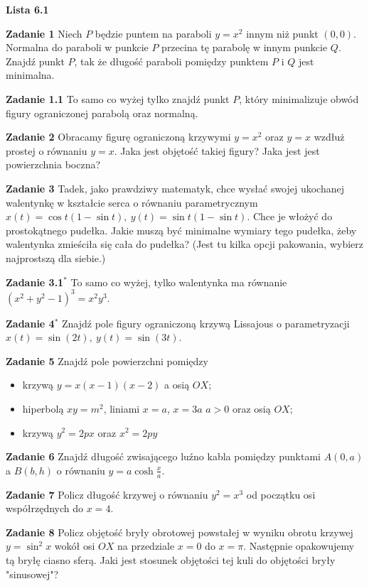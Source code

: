 \documentclass[a4paper,11pt]{article}
\begin{document}
\begin{center}
  {\large\textbf{Lista 6.1}}
\end{center}

\textbf{Zadanie 1}  Niech $P$ będzie puntem na paraboli $y=x^2$ innym niż
punkt  $(0,0)$. Normalna do paraboli w punkcie  $P$ przecina tę parabolę
w innym punkcie $Q$. Znajdź punkt $P$, tak że długość paraboli pomiędzy
punktem $P$ i $Q$ jest minimalna.

\bigskip

\textbf{Zadanie 1.1} To samo co wyżej tylko znajdź punkt $P$, który
minimalizuje obwód figury ograniczonej parabolą oraz normalną.

\bigskip

\textbf{Zadanie 2} Obracamy figurę ograniczoną krzywymi $y=x^2$ oraz
$y=x$ wzdłuż prostej o równaniu  $y=x$. Jaka jest objętość takiej figury?
Jaka jest jest powierzchnia boczna?

\bigskip 
\textbf{Zadanie 3} Tadek, jako prawdziwy matematyk, chce wysłać swojej
ukochanej walentynkę w kształcie serca o równaniu parametrycznym $x(t) =
\cos t (1-\sin t),~ y(t) = \sin t (1-\sin t)$. Chce je włożyć do
prostokątnego pudełka. Jakie muszą być minimalne wymiary tego pudełka,
żeby walentynka zmieściła się cała do pudełka? (Jest tu kilka opcji
pakowania, wybierz najprostszą dla siebie.)

\bigskip

\textbf{Zadanie 3.1$^\ast$} To samo co wyżej, tylko walentynka ma równanie
$(x^2 + y^2 - 1)^3 = x^2 y^3$.

\bigskip

\textbf{Zadanie 4$^\ast$} Znajdź pole figury ograniczoną krzywą Lissajous o
parametryzacji $x(t)  = \sin(2t), ~y(t) = \sin(3t)$.

\bigskip

\hrulefill

\bigskip

\textbf{Zadanie 5} Znajdź pole powierzchni pomiędzy 
\begin{itemize}
    \item krzywą $y=x(x-1)(x-2)$ a osią  $OX$;
    \item hiperbolą $xy = m^2$, liniami  $x=a$, $x=3a$ $a>0$ oraz osią
        $OX$;
    \item krzywą  $y^2 = 2px$ oraz  $x^2 = 2py$
\end{itemize}

\bigskip

\textbf{Zadanie 6} Znajdź długość zwisającego luźno kabla pomiędzy
punktami $A(0,a)$ a  $B(b,h)$ o równaniu  $y=a\cosh \frac{x}{a}$.

\bigskip

\textbf{Zadanie 7} Policz długość krzywej o równaniu $y^2 = x^3$ od
początku osi współrzędnych do  $x=4$.

\bigskip

 \textbf{Zadanie 8} Policz objętość bryły obrotowej powstałej w wyniku
 obrotu krzywej $y = \sin^2 x$ wokół osi $OX$ na przedziale  $x=0$ do
 $x=\pi$. Następnie opakowujemy tą bryłę ciasno sferą. Jaki jest stosunek
 objętości tej kuli do objętości bryły "sinusowej"?
\end{document}

